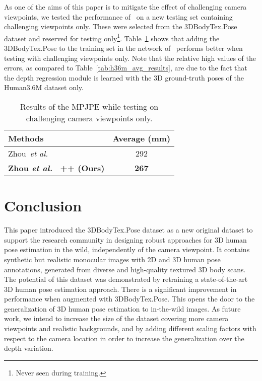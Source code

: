 \documentclass{article}
\begin{document}
\noindent As one of the aims of this paper is to mitigate the effect of challenging camera viewpoints, we tested the performance of~\cite{zhou2017towards} on a new testing set containing challenging viewpoints only. These were selected from the 3DBodyTex.Pose dataset and reserved for testing only\footnote{Never seen during training.}. Table~\ref{tab:extreme_vp} shows that adding the 3DBodyTex.Pose to the training set in the network of~\cite{zhou2017towards} performs better when testing with challenging viewpoints only. Note that the relative high values of the errors, as compared to Table~\ref{tab:h36m_avg_results}, are due to the fact that the depth regression module is learned with the 3D ground-truth poses of the Human3.6M dataset only.

\begin{table}[t]
\vspace{-0.1cm}
\centering
\begin{tabular}{l|c}
\hline
Methods                                                                 & Average (mm) \\ \hline
Zhou~\textit{et al.}~\cite{zhou2017towards}                             & 292          \\
\textbf{Zhou \textit{et al.}~\cite{zhou2017towards} ++ (Ours)}   & \textbf{267}         
\end{tabular}
\caption{Results of the MPJPE while testing on challenging camera viewpoints only.}
\label{tab:extreme_vp}
\vspace{-0.2cm}
\end{table}









\vspace{-0.2cm}
\section{Conclusion}
\label{sec:conclusion}
\vspace{-0.1cm}
This paper introduced the 3DBodyTex.Pose dataset as a new original dataset to support the research community in designing robust approaches for 3D human pose estimation in the wild, independently of the camera viewpoint. It contains synthetic but realistic monocular images with 2D and 3D human pose annotations, generated from diverse and high-quality textured 3D body scans. The potential of this dataset was demonstrated by retraining a state-of-the-art 3D human pose estimation approach. There is a significant improvement in performance when augmented with 3DBodyTex.Pose. This opens the door to the generalization of 3D human pose estimation to in-the-wild images. As future work, we intend to increase the size of the dataset covering more camera viewpoints and realistic backgrounds, and by adding different scaling factors with respect to the camera location in order to increase the generalization over the depth variation.







\end{document}
